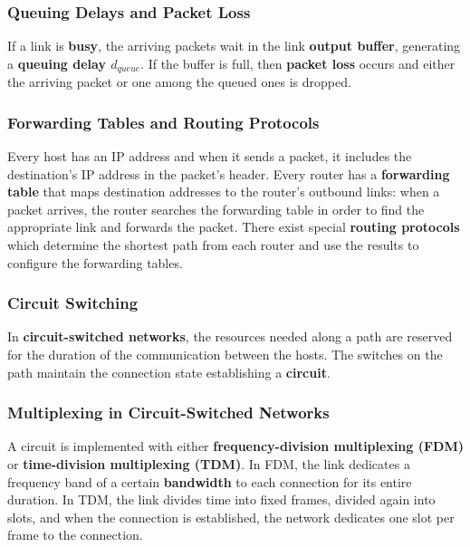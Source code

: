 \documentclass{article}
\begin{document}
\subsubsection*{Queuing Delays and Packet Loss}
If a link is \textbf{busy}, the arriving packets wait in the link \textbf{output buffer}, generating a \textbf{queuing delay $ d_{queue} $}. If the buffer is full, then \textbf{packet loss} occurs and either the arriving packet or one among the queued ones is dropped.
\subsubsection*{Forwarding Tables and Routing Protocols}
Every host has an IP address and when it sends a packet, it includes the destination’s IP address in the packet’s header. Every router has a \textbf{forwarding table} that maps destination addresses to the router’s outbound links: when a packet arrives, the router searches the forwarding table in order to find the appropriate link and forwards the packet. There exist special \textbf{routing protocols} which determine the shortest path from each router and use the results to configure the forwarding tables.
\subsubsection{Circuit Switching}
In \textbf{circuit-switched networks}, the resources needed along a path are reserved for the duration of the communication between the hosts. The switches on the path maintain the connection state establishing a \textbf{circuit}.
\newpage
\subsubsection*{Multiplexing in Circuit-Switched Networks}
A circuit is implemented with either \textbf{frequency-division multiplexing (FDM)} or \textbf{time-division multiplexing (TDM)}. In FDM, the link dedicates a frequency band of a certain \textbf{bandwidth} to each connection for its entire duration. In TDM, the link divides time into fixed frames, divided again into slots, and when the connection is established, the network dedicates one slot per frame to the connection.
\end{document}
